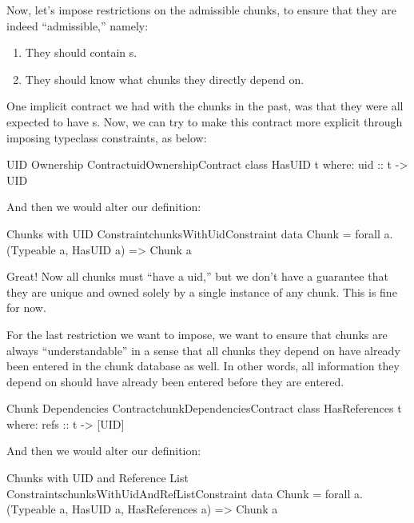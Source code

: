 Now, let's impose restrictions on the admissible chunks, to ensure that they are
indeed ``admissible,'' namely:

\begin{enumerate}
      
      \item They should contain \UID{}s.
      
      \item They should know what chunks they directly depend on.

\end{enumerate}

One implicit contract we had with the chunks in the past, was that they were all
expected to have \UID{}s. Now, we can try to make this contract more explicit
through imposing typeclass constraints, as below:

\begin{pseudohaskell}{UID Ownership Contract}{uidOwnershipContract}
class HasUID t where:
      uid :: t -> UID
\end{pseudohaskell}

And then we would alter our \Chunk{} definition:

\begin{pseudohaskell}{Chunks with UID Constraint}{chunksWithUidConstraint}
data Chunk = forall a. (Typeable a, HasUID a) => Chunk a
\end{pseudohaskell}

Great! Now all chunks must ``have a \acs{uid},'' but we don't have a guarantee
that they are unique and owned solely by a single instance of any chunk. This is
fine for now.

For the last restriction we want to impose, we want to ensure that chunks are
always ``understandable'' in a sense that all chunks they depend on have already
been entered in the chunk database as well. In other words, all information they
depend on should have already been entered before they are entered.

\begin{pseudohaskell}{Chunk Dependencies Contract}{chunkDependenciesContract}
class HasReferences t where:
      refs :: t -> [UID]
\end{pseudohaskell}

And then we would alter our \Chunk{} definition:

\begin{pseudohaskell}{Chunks with UID and Reference List Constraints}{chunksWithUidAndRefListConstraint}
data Chunk = forall a. (Typeable a, HasUID a, HasReferences a) => Chunk a
\end{pseudohaskell}

